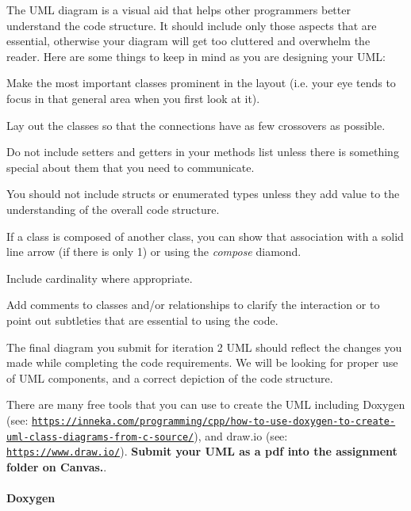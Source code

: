 The U\+ML diagram is a visual aid that helps other programmers better understand the code structure. It should include only those aspects that are essential, otherwise your diagram will get too cluttered and overwhelm the reader. Here are some things to keep in mind as you are designing your U\+ML\+:


\begin{DoxyItemize}
\item Make the most important classes prominent in the layout (i.\+e. your eye tends to focus in that general area when you first look at it).
\item Lay out the classes so that the connections have as few crossovers as possible.
\item Do not include setters and getters in your methods list unless there is something special about them that you need to communicate.
\item You should not include structs or enumerated types unless they add value to the understanding of the overall code structure.
\item If a class is composed of another class, you can show that association with a solid line arrow (if there is only 1) or using the {\itshape compose} diamond.
\item Include cardinality where appropriate.
\item Add comments to classes and/or relationships to clarify the interaction or to point out subtleties that are essential to using the code.
\end{DoxyItemize}

The final diagram you submit for iteration 2 U\+ML should reflect the changes you made while completing the code requirements. We will be looking for proper use of U\+ML components, and a correct depiction of the code structure.

There are many free tools that you can use to create the U\+ML including Doxygen (see\+: \href{https://inneka.com/programming/cpp/how-to-use-doxygen-to-create-uml-class-diagrams-from-c-source/}{\tt https\+://inneka.\+com/programming/cpp/how-\/to-\/use-\/doxygen-\/to-\/create-\/uml-\/class-\/diagrams-\/from-\/c-\/source/}), and draw.\+io (see\+: \href{https://www.draw.io/}{\tt https\+://www.\+draw.\+io/}). {\bfseries Submit your U\+ML as a pdf into the assignment folder on Canvas.}.

\paragraph*{Doxygen}

